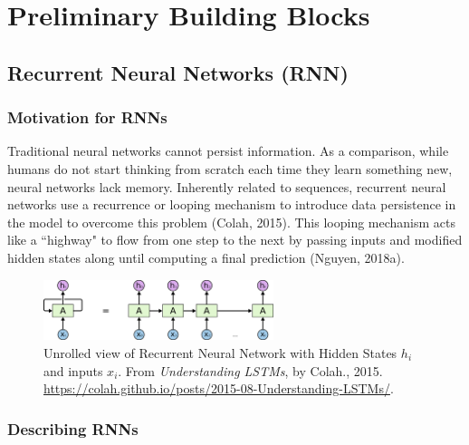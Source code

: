 \section{Preliminary Building Blocks}

\subsection{Recurrent Neural Networks (RNN)}

\subsubsection{Motivation for RNNs}

Traditional neural networks cannot persist information. As a comparison, while humans do not start thinking from scratch each time they learn something new, neural networks lack memory. Inherently related to sequences, recurrent neural networks use a recurrence or looping mechanism to introduce data persistence in the model to overcome this problem (Colah, 2015). This looping mechanism acts like a ``highway" to flow from one step to the next by passing inputs and modified hidden states along until computing a final prediction (Nguyen, 2018a). 

\begin{figure}[h]
\vspace{-5pt}
\centering
\includegraphics[width=0.6\textwidth]{imgs/rnn_colah_unrolled.png}
\vspace{-5pt}
\caption{\footnotesize Unrolled view of Recurrent Neural Network with Hidden States $h_i$ and inputs $x_i$. From \emph{Understanding LSTMs}, by Colah., 2015. \url{https://colah.github.io/posts/2015-08-Understanding-LSTMs/}. }
\vspace{-5pt}
\end{figure}


\subsubsection{Describing RNNs}


